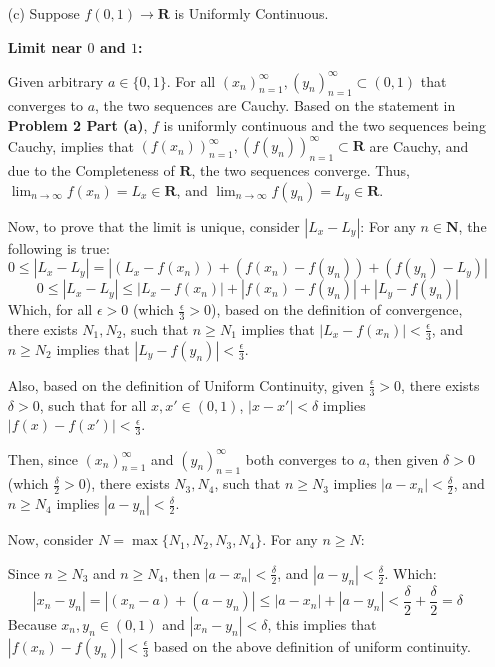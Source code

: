 \documentclass{article}
\begin{document}
\begin{itemize}
    \hfill

    \item[(c)] Suppose $f(0,1) \rightarrow \mathbf{R}$ is Uniformly Continuous.

    \textbf{Limit near $0$ and $1$:}
    
    Given arbitrary $a \in \{0,1\}$. For all $(x_n)_{n=1}^{\infty}, (y_n)_{n=1}^{\infty} \subset (0,1)$ that converges to $a$, the two sequences are Cauchy. Based on the statement in \textbf{Problem 2 Part (a)}, $f$ is uniformly continuous and the two sequences being Cauchy, implies that $(f(x_n))_{n=1}^{\infty}, (f(y_n))_{n=1}^{\infty} \subset \mathbf{R}$ are Cauchy, and due to the Completeness of $\mathbf{R}$, the two sequences converge. Thus, $\lim_{n \rightarrow \infty}f(x_n) = L_x \in \mathbf{R}$, and $\lim_{n \rightarrow \infty} f(y_n) = L_y \in \mathbf{R}$.

    Now, to prove that the limit is unique, consider $|L_x-L_y|$: For any $n\in\mathbf{N}$, the following is true:
    $$0 \leq |L_x-L_y| = \left|(L_x-f(x_n)) + (f(x_n)-f(y_n)) + (f(y_n)-L_y)\right|$$
    $$0 \leq |L_x-L_y| \leq |L_x-f(x_n)| + |f(x_n)-f(y_n)| + |L_y - f(y_n)|$$
    Which, for all $\epsilon>0$ (which $\frac{\epsilon}{3} >0$), based on the definition of convergence, there exists $N_1, N_2$, such that $n\geq N_1$ implies that $|L_x-f(x_n)| < \frac{\epsilon}{3}$, and $n \geq N_2$ implies that $|L_y-f(y_n)| < \frac{\epsilon}{3}$.

    \hfill

    Also, based on the definition of Uniform Continuity, given $\frac{\epsilon}{3}>0$, there exists $\delta >0$, such that for all $x,x' \in (0,1)$, $|x-x'|<\delta$ implies $|f(x)-f(x')| < \frac{\epsilon}{3}$.

    Then, since $(x_n)_{n=1}^{\infty}$ and $(y_n)_{n=1}^{\infty}$ both converges to $a$, then given $\delta >0$ (which $\frac{\delta}{2}>0$), there exists $N_3, N_4$, such that $n\geq N_3$ implies $|a-x_n| < \frac{\delta}{2}$, and $n \geq N_4$ implies $|a-y_n| < \frac{\delta}{2}$.

    \hfill

    Now, consider $N = \max\{N_1,N_2,N_3,N_4\}$. For any $n \geq N$:
    
    Since $n \geq N_3$ and $n \geq N_4$, then $|a-x_n| < \frac{\delta}{2}$, and $|a-y_n| < \frac{\delta}{2}$. Which:
    $$|x_n-y_n| = |(x_n-a)+(a-y_n)| \leq |a-x_n| + |a-y_n| < \frac{\delta}{2}+\frac{\delta}{2} =\delta$$
    Because $x_n, y_n \in (0,1)$ and $|x_n-y_n| < \delta$, this implies that $|f(x_n)-f(y_n)| < \frac{\epsilon}{3}$ based on the above definition of uniform continuity.


\end{itemize}
\end{document}

